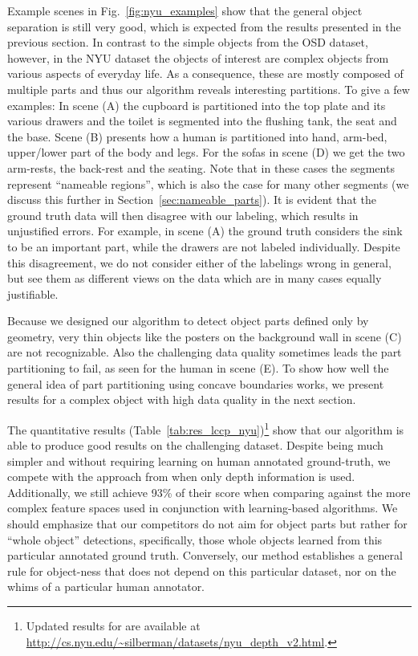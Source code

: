 Example scenes in Fig.~\ref{fig:nyu_examples} show that the general object separation is still very good, which is expected from the results presented in the previous section. In contrast to the simple objects from the OSD dataset, however, in the NYU dataset the objects of interest are complex objects from various aspects of everyday life. As a consequence, these are mostly composed of multiple parts and thus our algorithm reveals interesting partitions. To give a few examples: In scene (A) the cupboard is partitioned into the top plate and its various drawers and the toilet is segmented into the flushing tank, the seat and the base. Scene (B) presents how a human is partitioned into hand, arm-bed, upper/lower part of the body and legs. For the sofas in scene (D) we get the two arm-rests, the back-rest and the seating. Note that in these cases the segments represent ``nameable regions'', which is also the case for many other segments (we discuss this further in Section~\ref{sec:nameable_parts}). It is evident that the ground truth data will then disagree with our labeling, which results in unjustified errors. For example, in scene (A) the ground truth considers the sink to be an important part, while the drawers are not labeled individually. Despite this disagreement, we do not consider either of the labelings wrong in general, but see them as different views on the data which are in many cases equally justifiable.

Because we designed our algorithm to detect object parts defined only by geometry, very thin objects like the posters on the background wall in scene (C) are not recognizable. Also the challenging data quality sometimes leads the part partitioning to fail, as seen for the human in scene (E). To show how well the general idea of part partitioning using concave boundaries works, we present results for a complex object with high data quality in the next section.

The quantitative results (Table~\ref{tab:res_lccp_nyu})\footnote{Updated results for \cite{Silberman:ECCV12} are available at \url{http://cs.nyu.edu/~silberman/datasets/nyu_depth_v2.html}.} show that our algorithm is able to produce good results on the challenging dataset. Despite being much simpler and without requiring learning on human annotated ground-truth, we compete with the approach from \cite{Silberman:ECCV12} when only depth information is used. Additionally, we still achieve 93\% of their score when comparing against the more complex feature spaces used in conjunction with learning-based algorithms. We should emphasize that our competitors do not aim for object parts but rather for ``whole object'' detections, specifically, those whole objects learned from this particular annotated ground truth. Conversely, our method establishes a general rule for object-ness that does not depend on this particular dataset, nor on the whims of a particular human annotator.

